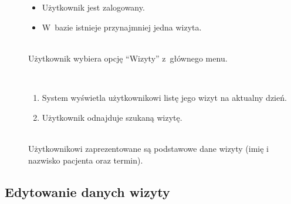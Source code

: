 \documentclass[11pt]{aghdpl}
\begin{document}
	\begin{description}
		\item[\useCaseAktor] \hfill \\
			\useCaseUzytkownik
		\item[\useCaseWarPocz] \hfill \\
		\begin{itemize}
			\item Użytkownik jest zalogowany.
			\item W~bazie istnieje przynajmniej jedna wizyta.
		\end{itemize}
		\item[\useCaseZdarzInicj] \hfill \\
			Użytkownik wybiera opcję ``Wizyty'' z~głównego menu.
		\item[\useCaseScenBaz] \hfill \\ 
			\begin{enumerate}
			\item System wyświetla użytkownikowi listę jego wizyt na aktualny dzień.
			\item Użytkownik odnajduje szukaną wizytę.
			\end{enumerate}
		\item[\useCaseWarKonc] \hfill \\ 
			Użytkownikowi zaprezentowane są podstawowe dane wizyty (imię i nazwisko pacjenta oraz termin).
	\end{description}

\subsection{Edytowanie danych wizyty}
\end{document}
